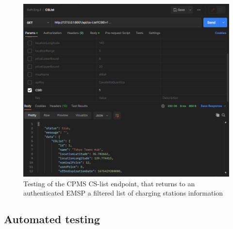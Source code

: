 \documentclass[11pt]{article}
\begin{document}
\begin{enumerate}
    \begin{figure}[!ht]
        \centering
        \includegraphics[width=120mm]{CSList.PNG}
        \captionsetup{justification=centering,margin=2cm}
        \caption{Testing of the CPMS CS-list endpoint, that returns to an authenticated EMSP a filtered list of charging stations information}
        \label{fig:my_label}
    \end{figure}
    
\end{enumerate}

\newpage

\subsection{Automated testing}
\end{document}
